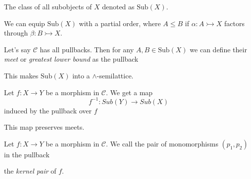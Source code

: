 \documentclass[14pt]{beamer}
\theoremstyle{plain}
\begin{document}
  \begin{frame}
    \begin{definition}
      The class of all subobjects of $X$ denoted as $\mathrm{Sub}(X)$.
    \end{definition}
    \pause
    We can equip $\mathrm{Sub}(X)$ with a partial order, where $A \leq B$ if
    $\alpha : A \rightarrowtail X$ factors through $\beta : B \rightarrowtail X$.
    \pause
  \end{frame}

  \begin{frame}[fragile]
    Let's say $\mathcal{C}$ has all pullbacks.
    \pause
    Then for any $A, B \in \mathrm{Sub}(X)$ we can define their \emph{meet} or
    \emph{greatest lower bound} as the pullback
    \begin{center}
    \end{center}
    \pause
    This makes $\mathrm{Sub}(X)$ into a $\land$-semilattice.
  \end{frame}

  \begin{frame}[fragile]
    Let $f : X \to Y$ be a morphism in $\mathcal{C}$. We get a map
    \[ f^{-1} : Sub(Y) \to Sub(X) \]
    \pause
    induced by the pullback over $f$
    \begin{center}
    \end{center}
    \pause
    This map preserves meets.
  \end{frame}

  \begin{frame}[fragile]
    \begin{definition}
      Let $f : X \to Y$ be a morphism in $\mathcal{C}$. We call the pair of monomorphisms
      $(p_1, p_2)$ in the pullback
      \begin{center}
      \end{center}
      the \emph{kernel pair} of $f$.
    \end{definition}
  \end{frame}
\end{document}
